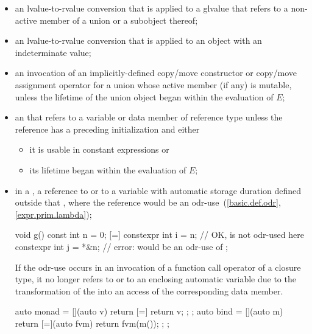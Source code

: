 \begin{itemize}
\item
an lvalue-to-rvalue conversion
that is applied to a glvalue
that refers to a non-active member of a union or a subobject thereof;

\item
an lvalue-to-rvalue conversion that is applied to
an object with an indeterminate value;

\item
an invocation of an implicitly-defined copy/move constructor or
copy/move assignment operator
for a union whose active member (if any) is mutable,
unless the lifetime of the union object began within the evaluation of $E$;

\item
an  that refers to a variable or
data member of reference type
unless the reference has a preceding initialization and either
\begin{itemize}
  \item
  it is usable in constant expressions or

  \item
  its lifetime began within the evaluation of $E$;
\end{itemize}

\item
in a ,
a reference to  or to a variable with
automatic storage duration defined outside that
, where
the reference would be an odr-use~(\ref{basic.def.odr}, \ref{expr.prim.lambda});
\begin{example}
\begin{codeblock}
void g() {
  const int n = 0;
  [=] {
    constexpr int i = n;        // OK,  is not odr-used here
    constexpr int j = *&n;      // error:  would be an odr-use of 
  };
}
\end{codeblock}
\end{example}
\begin{note}
If the odr-use occurs in an invocation
of a function call operator of a closure type,
it no longer refers to  or to an enclosing automatic variable
due to the transformation
of the  into
an access of the corresponding data member.
\begin{example}
\begin{codeblock}
auto monad = [](auto v) { return [=] { return v; }; };
auto bind = [](auto m) {
  return [=](auto fvm) { return fvm(m()); };
};


\end{codeblock}
\end{example}
\end{note}
\end{itemize}
